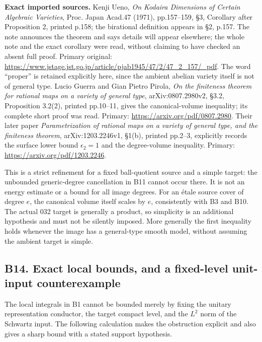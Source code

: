 \documentclass[11pt,a4paper]{article}
\theoremstyle{definition}
\begin{document}
\textbf{Exact imported sources.} Kenji Ueno, \emph{On Kodaira Dimensions of Certain Algebraic Varieties}, Proc. Japan Acad.47 (1971), pp.157--159, §3, Corollary after Proposition 2, printed p.158; the birational definition appears in §2, p.157. The note announces the theorem and says details will appear elsewhere; the whole note and the exact corollary were read, without claiming to have checked an absent full proof. Primary original: \url{https://www.jstage.jst.go.jp/article/pjab1945/47/2/47_2_157/_pdf}. The word ``proper'' is retained explicitly here, since the ambient abelian variety itself is not of general type. Lucio Guerra and Gian Pietro Pirola, \emph{On the finiteness theorem for rational maps on a variety of general type}, arXiv:0807.2980v2, §3.2, Proposition 3.2(2), printed pp.10--11, gives the canonical-volume inequality; its complete short proof was read. Primary: \url{https://arxiv.org/pdf/0807.2980}. Their later paper \emph{Parametrization of rational maps on a variety of general type, and the finiteness theorem}, arXiv:1203.2246v1, §1(b), printed pp.2--3, explicitly records the surface lower bound \(\epsilon_2=1\) and the degree-volume inequality. Primary: \url{https://arxiv.org/pdf/1203.2246}.

This is a strict refinement for a fixed ball-quotient source and a simple target: the unbounded generic-degree cancellation in B11 cannot occur there. It is not an energy estimate or a bound for all image degrees. For an étale source cover of degree \(e\), the canonical volume itself scales by \(e\), consistently with B3 and B10. The actual 032 target is generally a product, so simplicity is an additional hypothesis and must not be silently imposed. More generally the first inequality holds whenever the image has a general-type smooth model, without assuming the ambient target is simple.

\subsection{B14. Exact local bounds, and a fixed-level unit-input counterexample}\label{b14.-exact-local-bounds-and-a-fixed-level-unit-input-counterexample}

The local integrals in B1 cannot be bounded merely by fixing the unitary representation conductor, the target compact level, and the \(L^2\) norm of the Schwartz input. The following calculation makes the obstruction explicit and also gives a sharp bound with a stated support hypothesis.
\end{document}
